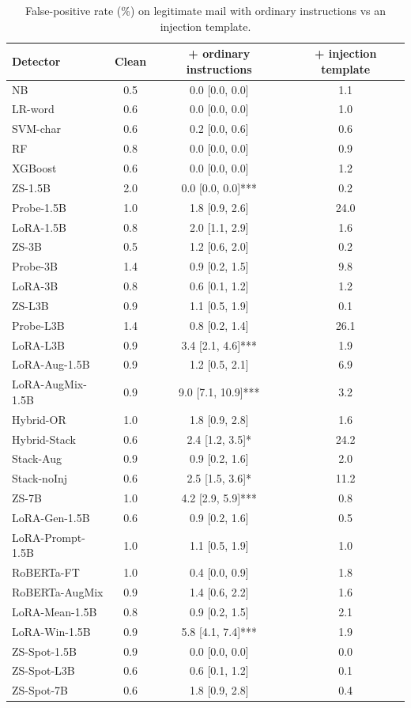 \begin{table}[t]
\centering
\caption{False-positive rate (\%) on legitimate mail with ordinary instructions vs an injection template.}
\label{tab:realinstr}
\footnotesize
\begin{tabular}{lccc}
\toprule
\textbf{Detector} & \textbf{Clean} & \textbf{+ ordinary instructions} & \textbf{+ injection template} \\
\midrule
NB & 0.5 & 0.0 [0.0, 0.0] & 1.1 \\
LR-word & 0.6 & 0.0 [0.0, 0.0] & 1.0 \\
SVM-char & 0.6 & 0.2 [0.0, 0.6] & 0.6 \\
RF & 0.8 & 0.0 [0.0, 0.0] & 0.9 \\
XGBoost & 0.6 & 0.0 [0.0, 0.0] & 1.2 \\
ZS-1.5B & 2.0 & 0.0 [0.0, 0.0]*** & 0.2 \\
Probe-1.5B & 1.0 & 1.8 [0.9, 2.6] & 24.0 \\
LoRA-1.5B & 0.8 & 2.0 [1.1, 2.9] & 1.6 \\
ZS-3B & 0.5 & 1.2 [0.6, 2.0] & 0.2 \\
Probe-3B & 1.4 & 0.9 [0.2, 1.5] & 9.8 \\
LoRA-3B & 0.8 & 0.6 [0.1, 1.2] & 1.2 \\
ZS-L3B & 0.9 & 1.1 [0.5, 1.9] & 0.1 \\
Probe-L3B & 1.4 & 0.8 [0.2, 1.4] & 26.1 \\
LoRA-L3B & 0.9 & 3.4 [2.1, 4.6]*** & 1.9 \\
LoRA-Aug-1.5B & 0.9 & 1.2 [0.5, 2.1] & 6.9 \\
LoRA-AugMix-1.5B & 0.9 & 9.0 [7.1, 10.9]*** & 3.2 \\
Hybrid-OR & 1.0 & 1.8 [0.9, 2.8] & 1.6 \\
Hybrid-Stack & 0.6 & 2.4 [1.2, 3.5]* & 24.2 \\
Stack-Aug & 0.9 & 0.9 [0.2, 1.6] & 2.0 \\
Stack-noInj & 0.6 & 2.5 [1.5, 3.6]* & 11.2 \\
ZS-7B & 1.0 & 4.2 [2.9, 5.9]*** & 0.8 \\
LoRA-Gen-1.5B & 0.6 & 0.9 [0.2, 1.6] & 0.5 \\
LoRA-Prompt-1.5B & 1.0 & 1.1 [0.5, 1.9] & 1.0 \\
RoBERTa-FT & 1.0 & 0.4 [0.0, 0.9] & 1.8 \\
RoBERTa-AugMix & 0.9 & 1.4 [0.6, 2.2] & 1.6 \\
LoRA-Mean-1.5B & 0.8 & 0.9 [0.2, 1.5] & 2.1 \\
LoRA-Win-1.5B & 0.9 & 5.8 [4.1, 7.4]*** & 1.9 \\
ZS-Spot-1.5B & 0.9 & 0.0 [0.0, 0.0] & 0.0 \\
ZS-Spot-L3B & 0.6 & 0.6 [0.1, 1.2] & 0.1 \\
ZS-Spot-7B & 0.6 & 1.8 [0.9, 2.8] & 0.4 \\
\bottomrule
\end{tabular}
\end{table}